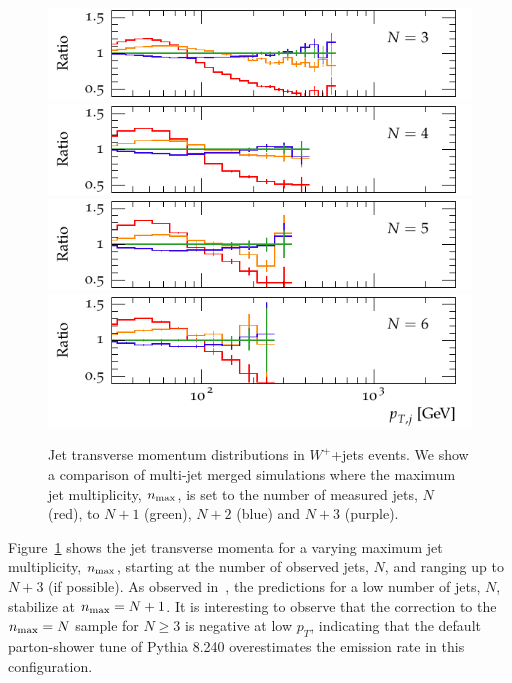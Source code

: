 \documentclass[aps,prd,twocolumn,fleqn,superscriptaddress,groupedaddress,nofootinbib,preprintnumbers]{revtex4}
\begin{document}
\begin{figure}[t]
\begin{minipage}{0.475\textwidth}
      \includegraphics[width=\textwidth]{fig/wpj/jet_pT_diff_3.pdf}\\[-1mm]
      \includegraphics[width=\textwidth]{fig/wpj/jet_pT_diff_4.pdf}\\[-1mm]
      \includegraphics[width=\textwidth]{fig/wpj/jet_pT_diff_5.pdf}\\[-1mm]
      \includegraphics[width=\textwidth]{fig/wpj/jet_pT_diff_6.pdf}
    \end{minipage}
    \caption{Jet transverse momentum distributions in $W^+$+jets events.
      We show a comparison of multi-jet merged simulations where the
      maximum jet multiplicity, $n_{\rm max}$, is set to the number of
      measured jets, $N$ (red), to $N+1$ (green), $N+2$ (blue) and
      $N+3$ (purple).}
    \label{fig:jet_pT}
\end{figure}
Figure~\ref{fig:jet_pT} shows the jet transverse momenta for a varying
maximum jet multiplicity, $n_{\rm max}$, starting at the number of
observed jets, $N$, and ranging up to $N+3$ (if possible). As observed
in~\cite{Krauss:2004bs,Krauss:2005nu}, the predictions for a low number
of jets, $N$, stabilize at $n_{\rm max}=N+1$. It is interesting
to observe that the correction to the $n_{\rm max}=N$ sample for $N\ge 3$
is negative at low $p_T$, indicating that the default parton-shower
tune of Pythia 8.240 overestimates the emission rate in this configuration.
\end{document}
